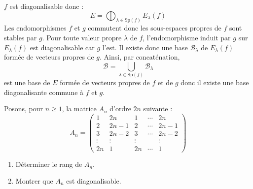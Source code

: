 \documentclass[a4paper,10pt]{report}
\begin{document}
\corr $f$ est diagonalisable donc :
$$ E = \bigoplus_{\lambda \in \textrm{Sp}(f)} E_{\lambda}(f)$$
Les endomorphismes $f$ et $g$ commutent donc les sous-espaces propres de $f$ sont stables par $g$. Pour toute valeur propre $\lambda$ de $f$, l'endomorphisme induit par $g$ sur $E_{\lambda}(f)$ est diagonalisable car $g$ l'est. Il existe donc une base $\mathcal{B}_{\lambda}$ de $E_{\lambda}(f)$ formée de vecteurs propres de $g$. Ainsi, par concaténation,
$$ \mathcal{B} = \bigcup_{\lambda  \in \textrm{Sp}(f)} \mathcal{B}_{\lambda}$$
est une base de $E$ formée de vecteurs propres de $f$ et de $g$ donc il existe une base diagonalisante commune à $f$ et $g$.

\begin{Exercice}{} Posons, pour $n \geq 1$, la matrice $A_n$ d'ordre $2n$ suivante :
$$ A_n = \begin{pmatrix}
1 & 2n & 1 & \cdots & 2n \\
2 & 2n-1 & 2 & \cdots & 2n-1 \\
3 & 2n-2 & 3 & \cdots & 2n-2 \\
\vdots & \vdots & \vdots &  & \vdots \\
2n & 1 & 2n & \cdots & 1
\end{pmatrix}$$

\begin{enumerate}
\item Déterminer le rang de $A_n$.
\item Montrer que $A_n$ est diagonalisable.
\end{enumerate}
\end{Exercice}

\corr 
\end{document}
